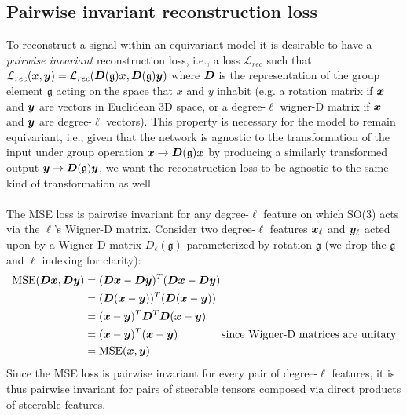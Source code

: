 \subsection{Pairwise invariant reconstruction loss}
\label{sec:pairwise_inv_rec_loss}
To reconstruct a signal within an equivariant model it is desirable to have a \textit{pairwise
invariant} reconstruction loss, i.e., a loss $\mathcal{L}_{rec}$ such that $\mathcal{L}_{rec}({\bm{x}},
{\bm{y}}) = \mathcal{L}_{rec}({\bm{D}}(\mathfrak{g}){\bm{x}}, {\bm{D}}(\mathfrak{g}){\bm{y}})$ where ${\bm{D}}$ is the
representation of the group element $\mathfrak{g}$ acting on the space that $x$ and $y$ inhabit
(e.g. a rotation matrix if ${\bm{x}}$ and ${\bm{y}}$ are vectors in Euclidean 3D space, or a degree-$\ell$
wigner-D matrix if ${\bm{x}}$ and ${\bm{y}}$ are degree-$\ell$ vectors). This  property is necessary for the
model to remain equivariant, i.e., given that the network is agnostic to the transformation of the
input under group operation ${\bm{x}} \to {\bm{D}}(\mathfrak{g}){\bm{x}}$ by producing a similarly transformed
output ${\bm{y}} \to {\bm{D}}(\mathfrak{g}){\bm{y}}$, we want the reconstruction loss to be agnostic to the same
kind of transformation as well\\
\\
The MSE loss is pairwise invariant for any degree-$\ell$ feature on which SO(3) acts via the
$\ell$'s Wigner-D matrix. Consider two degree-$\ell$ features ${\bm{x}}_{\ell}$ and ${\bm{y}}_{\ell}$ acted
upon by a Wigner-D matrix $D_{\ell}(\mathfrak{g})$ parameterized by rotation $\mathfrak{g}$ (we
drop the $\mathfrak{g}$ and $\ell$ indexing for clarity):
\begin{align}
 \nonumber    \text{MSE}({\bm{D}}{\bm{x}}, {\bm{D}}{\bm{y}}) &= ({\bm{D}}{\bm{x}} - {\bm{D}}{\bm{y}})^{T} ({\bm{D}}{\bm{x}} - {\bm{D}}{\bm{y}}) \\
  \nonumber                       &= ({\bm{D}}({\bm{x}} - {\bm{y}}))^{T} ({\bm{D}}({\bm{x}} - {\bm{y}})) \\
  \nonumber                       &= ({\bm{x}} - {\bm{y}})^{T}{\bm{D}}^{T} {\bm{D}}({\bm{x}} - {\bm{y}}) \\
  \nonumber                       &= ({\bm{x}} - {\bm{y}})^{T} ({\bm{x}} - {\bm{y}}) \qquad \qquad \text{since Wigner-D matrices are unitary} \\ 
  \nonumber                       &= \text{MSE}({\bm{x}}, {\bm{y}})\\
\end{align}
Since the MSE loss is pairwise invariant for every pair of degree-$\ell$ features, it is thus
pairwise invariant for pairs of steerable tensors composed via direct products of steerable
features.

